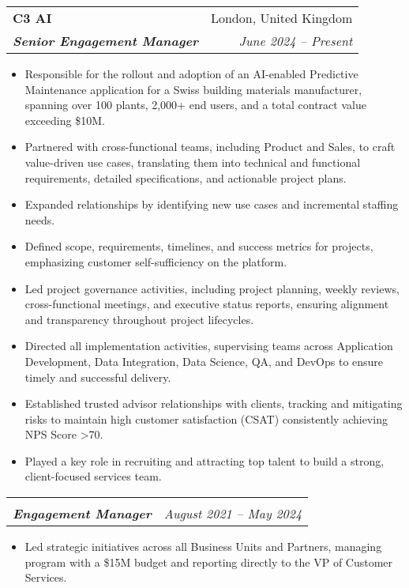 \documentclass[letterpaper,11pt,usenames,dvipsnames]{article}
\makeatletter
\newcommand{\resumeItem}[1]{ \item\small{{#1 \vspace{-2pt}}}}
\newcommand{\resumeSubheading}[4]{
  \vspace{-2pt}\item
    \begin{tabular*}{0.97\textwidth}[t]{l@{\extracolsep{\fill}}r}
      \textbf{#1} & #2 \\
      \hspace{0.5em}\textbf{\textit{\small#3}} & \textit{\small #4} \\
    \end{tabular*}\vspace{-7pt}
}
\newcommand{\resumeItemListStart}{\begin{itemize}}
\newcommand{\resumeItemListEnd}{\end{itemize}\vspace{-5pt}}
\makeatother
\begin{document}
    \resumeSubheading
      {C3 AI}{London, United Kingdom}
      {Senior Engagement Manager}{June 2024 -- Present}
      \begin{itemize}[leftmargin=0.15in, label={}]
        \item \small{Responsible for the rollout and adoption of an AI-enabled Predictive Maintenance application for a Swiss building materials manufacturer, spanning over 100 plants, 2,000+ end users, and a total contract value exceeding \$10M.}
      \end{itemize}
      \vspace{-1em} 
      \resumeItemListStart
        \resumeItem{Partnered with cross-functional teams, including Product and Sales, to craft value-driven use cases, translating them into technical and functional requirements, detailed specifications, and actionable project plans.}
        \resumeItem{Expanded relationships by identifying new use cases and incremental staffing needs.}
        \resumeItem{Defined scope, requirements, timelines, and success metrics for projects, emphasizing customer self-sufficiency on the platform.}
        \resumeItem{Led project governance activities, including project planning, weekly reviews, cross-functional meetings, and executive status reports, ensuring alignment and transparency throughout project lifecycles.}
        \resumeItem{Directed all implementation activities, supervising teams across Application Development, Data Integration, Data Science, QA, and DevOps to ensure timely and successful delivery.}
        \resumeItem{Established trusted advisor relationships with clients, tracking and mitigating risks to maintain high customer satisfaction (CSAT) consistently achieving NPS Score \textgreater70.}
        \resumeItem{Played a key role in recruiting and attracting top talent to build a strong, client-focused services team.}
      \resumeItemListEnd
      
\vspace{-1.5em} %
    \resumeSubheading
      {}{}
      {Engagement Manager}{August 2021 -- May 2024}
            \begin{itemize}[leftmargin=0.15in, label={}]
        \item \small{Led strategic initiatives across all Business Units and Partners, managing program with a \$15M budget and reporting directly to the VP of Customer Services.}
      \end{itemize}
      \vspace{0.2em} 
\end{document}
